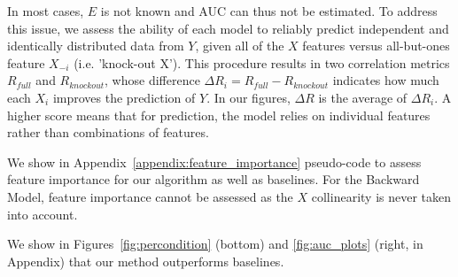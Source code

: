 In most cases, $E$ is not known and AUC can thus not be estimated. To address this issue, we assess the ability of each model to reliably predict
independent and identically distributed data from $Y$, given all of the $X$
features versus all-but-ones feature $X_{-i}$ (i.e. 'knock-out X'). This procedure
results in two correlation metrics $R_{full}$ and $R_{knockout}$, whose
difference $\Delta R_i = R_{full}-R_{knockout}$ indicates how much each $X_i$
improves the prediction of $Y$.
In our figures, $\Delta R$ is the average of $\Delta R_i$. A higher score means that for prediction, the model relies on individual features rather than combinations of features.

We show in Appendix~\ref{appendix:feature_importance} pseudo-code to assess feature importance for our algorithm as well as baselines. For the Backward Model, feature importance cannot be assessed as the $X$ collinearity is never taken into account.


We show in Figures~\ref{fig:percondition} (bottom) and \ref{fig:auc_plots} (right, in Appendix) that our method outperforms baselines.

%


